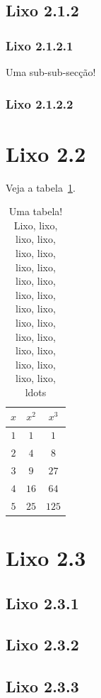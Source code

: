 \documentclass[11pt,twoside,a4paper]{report}
\begin{document}
\subsection{Lixo 2.1.2}

\subsubsection{Lixo 2.1.2.1}

Uma sub-sub-sec\c c\~ao!


\subsubsection{Lixo 2.1.2.2}


\section{Lixo 2.2}

Veja a tabela~\ref{t:tabela1}.

\begin{table}[hbt]
  \centering
  \begin{tabular}{c|c|c}
    $x$ & $x^2$ & $x^3$ \\\hline
    $1$ &   $1$ &   $1$ \\
    $2$ &   $4$ &   $8$ \\
    $3$ &   $9$ &  $27$ \\
    $4$ &  $16$ &  $64$ \\
    $5$ &  $25$ & $125$
  \end{tabular}
  \caption[Uma tabela!]{Uma tabela! Lixo, lixo, lixo, lixo, lixo, lixo, lixo, lixo, lixo, lixo,
    lixo, lixo, lixo, lixo, lixo, lixo, lixo, lixo, lixo, lixo, lixo, lixo, lixo, lixo, ldots}
  \label{t:tabela1}%
\end{table}

\section{Lixo 2.3}

\subsection{Lixo 2.3.1}

\subsection{Lixo 2.3.2}

\subsection{Lixo 2.3.3}
\end{document}

